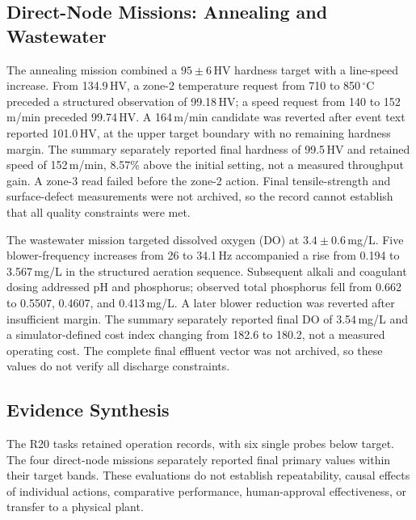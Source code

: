 \subsection{Direct-Node Missions: Annealing and Wastewater}
The annealing mission combined a $95\pm6$\,HV hardness target with a
line-speed increase. From 134.9\,HV, a zone-2 temperature request from 710 to
850\,$^{\circ}$C preceded a structured observation of 99.18\,HV; a speed
request from 140 to 152\,m/min preceded 99.74\,HV. A 164\,m/min candidate
was reverted after event text reported 101.0\,HV, at the upper target boundary
with no remaining hardness margin. The summary separately reported final
hardness of 99.5\,HV and retained speed of 152\,m/min, 8.57\% above the initial
setting, not a measured throughput gain. A zone-3 read failed before the
zone-2 action. Final tensile-strength and surface-defect measurements were
not archived, so the record cannot establish that all quality constraints
were met.

The wastewater mission targeted dissolved oxygen (DO) at $3.4\pm0.6$\,mg/L.
Five blower-frequency increases from 26 to 34.1\,Hz accompanied a rise from
0.194 to 3.567\,mg/L in the structured aeration sequence. Subsequent alkali
and coagulant dosing addressed pH and phosphorus; observed total phosphorus
fell from 0.662 to 0.5507, 0.4607, and 0.413\,mg/L. A later blower reduction
was reverted after insufficient margin. The summary separately reported final
DO of 3.54\,mg/L and a simulator-defined cost index changing from 182.6 to
180.2, not a measured operating cost. The complete final effluent vector was
not archived, so these values do not verify all discharge constraints.

\subsection{Evidence Synthesis}
The R20 tasks retained operation records, with six single probes below target.
The four direct-node missions separately reported final primary values within
their target bands. These evaluations do not establish repeatability, causal
effects of individual actions, comparative performance, human-approval
effectiveness, or transfer to a physical plant.
